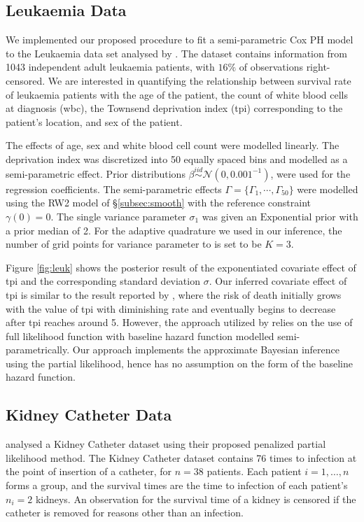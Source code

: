 \documentclass[ba]{imsart}
\begin{document}
\subsection{Leukaemia Data}\label{subsec:leuk}

We implemented our proposed procedure to fit a semi-parametric Cox PH model to the Leukaemia data set analysed by \cite{inlacoxph}. The dataset contains information from 1043 independent adult leukaemia patients, with $16\%$ of observations right-censored. We are interested in quantifying the relationship between survival rate of leukaemia patients with the age of the patient, the count of white blood cells at diagnosis (wbc), the Townsend deprivation index (tpi) corresponding to the patient's location, and sex of the patient.

The effects of age, sex and white blood cell count were modelled linearly. The deprivation index was discretized into 50 equally spaced bins and modelled as a semi-parametric effect. Prior distributions $\beta \stackrel{iid}{\sim} \mathcal{N}(0, 0.001^{-1})$, were used for the regression coefficients. The semi-parametric effects $\Gamma = \{\Gamma_{1}, \cdots, \Gamma_{50}\}$ were modelled using the RW2 model of \S\ref{subsec:smooth} with the reference constraint $\gamma(0) = 0$. The single variance parameter $\sigma_{1}$ was given an $\text{Exponential}$ prior with a prior median of 2. For the adaptive quadrature we used in our inference, the number of grid points for variance parameter to is set to be $K = 3$.

Figure \ref{fig:leuk} shows the posterior result of the exponentiated covariate effect of tpi and the corresponding standard deviation $\sigma$. Our inferred covariate effect of tpi is similar to the result reported by \cite{inlacoxph}, where the risk of death initially grows with the value of tpi with diminishing rate and eventually begins to decrease after tpi reaches around 5. However, the approach utilized by \cite{inlacoxph} relies on the use of full likelihood function with baseline hazard function modelled semi-parametrically. Our approach implements the approximate Bayesian inference using the partial likelihood, hence has no assumption on the form of the baseline hazard function. 


\subsection{Kidney Catheter Data}\label{subsec:kidney}

\cite{freqPL} analysed a Kidney Catheter dataset using their proposed penalized partial likelihood method. The Kidney Catheter dataset contains 76 times to infection at the point of insertion of a catheter, for $n = 38$ patients. Each patient $i=1,\ldots,n$ forms a group, and the survival times are the time to infection of each patient's $n_{i} = 2$ kidneys. An observation for the survival time of a kidney is censored if the catheter is removed for reasons other than an infection. 
\end{document}
